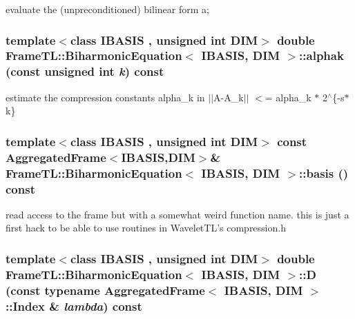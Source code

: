 evaluate the (unpreconditioned) bilinear form a; \hypertarget{classFrameTL_1_1BiharmonicEquation_9f424ae1bc3dbcc5490e6bd77240c71c}{
\subsubsection[{alphak}]{\setlength{\rightskip}{0pt plus 5cm}template$<$class IBASIS , unsigned int DIM$>$ double {\bf FrameTL::BiharmonicEquation}$<$ IBASIS, DIM $>$::alphak (const unsigned int {\em k}) const}}
\label{classFrameTL_1_1BiharmonicEquation_9f424ae1bc3dbcc5490e6bd77240c71c}


estimate the compression constants alpha\_\-k in $|$$|$A-A\_\-k$|$$|$ $<$= alpha\_\-k $\ast$ 2$^\wedge$\{-s$\ast$k\} \hypertarget{classFrameTL_1_1BiharmonicEquation_f197bfb03a8f123739a3311d803a1803}{
\subsubsection[{basis}]{\setlength{\rightskip}{0pt plus 5cm}template$<$class IBASIS , unsigned int DIM$>$ const {\bf AggregatedFrame}$<$IBASIS,DIM$>$\& {\bf FrameTL::BiharmonicEquation}$<$ IBASIS, DIM $>$::basis () const}}
\label{classFrameTL_1_1BiharmonicEquation_f197bfb03a8f123739a3311d803a1803}


read access to the frame but with a somewhat weird function name. this is just a first hack to be able to use routines in WaveletTL's compression.h \hypertarget{classFrameTL_1_1BiharmonicEquation_d16c3e0cfbdc25d321fece0ce1e7069e}{
\subsubsection[{D}]{\setlength{\rightskip}{0pt plus 5cm}template$<$class IBASIS , unsigned int DIM$>$ double {\bf FrameTL::BiharmonicEquation}$<$ IBASIS, DIM $>$::D (const typename {\bf AggregatedFrame}$<$ IBASIS, DIM $>$::{\bf Index} \& {\em lambda}) const}}
\label{classFrameTL_1_1BiharmonicEquation_d16c3e0cfbdc25d321fece0ce1e7069e}


